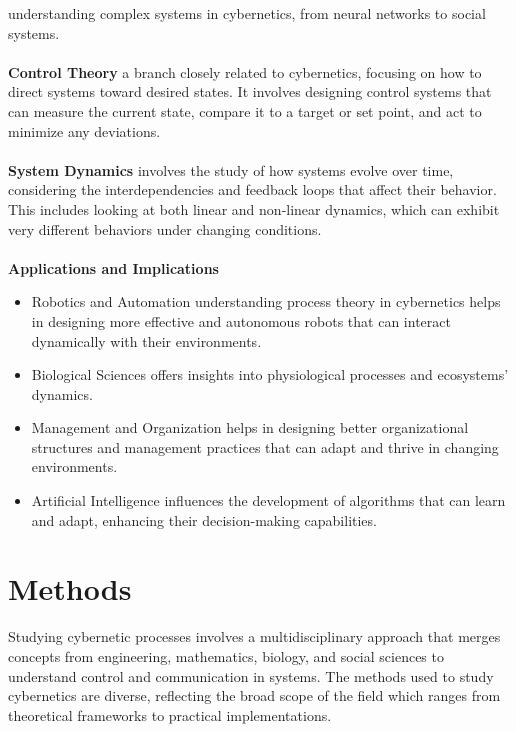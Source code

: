 \documentclass[12pt]{article}
\begin{document}
understanding complex systems in cybernetics, from neural networks to
social systems.\\
\\
\textbf{Control Theory} a branch closely related to cybernetics, focusing
on how to direct systems toward desired states. It involves designing
control systems that can measure the current state, compare it to a
target or set point, and act to minimize any deviations.\\
\\
\textbf{System Dynamics} involves the study of how systems evolve over
time, considering the interdependencies and feedback loops that affect
their behavior. This includes looking at both linear and non-linear
dynamics, which can exhibit very different behaviors under changing
conditions.\\
\\
\textbf{Applications and Implications}\\
\begin{itemize}
\item Robotics and Automation understanding process theory in cybernetics helps in designing more effective and autonomous robots that can interact dynamically with their environments.
\item Biological Sciences offers insights into physiological processes and ecosystems' dynamics.
\item Management and Organization helps in designing better organizational structures and management practices that can adapt and thrive in changing environments.
\item Artificial Intelligence influences the development of algorithms that can learn and adapt, enhancing their decision-making capabilities.
\end{itemize}
\section{Methods}
%
Studying cybernetic processes involves a multidisciplinary approach that
merges concepts from engineering, mathematics, biology, and social
sciences to understand control and communication in systems. The methods
used to study cybernetics are diverse, reflecting the broad scope of the
field which ranges from theoretical frameworks to practical
implementations.
%
\end{document}
